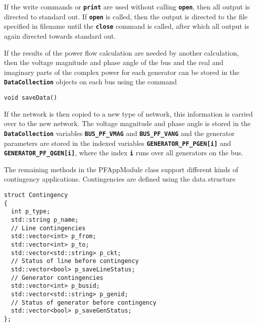 If the write commands or \texttt{\textbf{print}} are used without calling \texttt{\textbf{open}}, then all output is directed to standard out. If \texttt{\textbf{open}} is called, then the output is directed to the file specified in filename until the \texttt{\textbf{close}} command is called, after which all output is again directed towards standard out.

If the results of the power flow calculation are needed by another calculation, then the voltage magnitude and phase angle of the bus and the real and imaginary parts of the complex power for each generator can be stored in the \texttt{\textbf{DataCollection}} objects on each bus using the command

{
\color{red}
\begin{Verbatim}[fontseries=b]
void saveData()
\end{Verbatim}
}

If the network is then copied to a new type of network, this information is carried over to the new network. The voltage magnitude and phase angle is stored in the \texttt{\textbf{DataCollection}} variables \texttt{\textbf{BUS\_PF\_VMAG}} and \texttt{\textbf{BUS\_PF\_VANG}} and the generator parameters are stored in the indexed variables \texttt{\textbf{GENERATOR\_PF\_PGEN[i]}} and \texttt{\textbf{GENERATOR\_PF\_QGEN[i]}}, where the index \texttt{\textbf{i}} runs over all generators on the bus.

The remaining methods in the PFAppModule class support different kinds of contingency applications. Contingencies are defined using the data structure

{
\color{red}
\begin{Verbatim}[fontseries=b]
struct Contingency
{
  int p_type;
  std::string p_name;
  // Line contingencies
  std::vector<int> p_from;
  std::vector<int> p_to;
  std::vector<std::string> p_ckt;
  // Status of line before contingency
  std::vector<bool> p_saveLineStatus;
  // Generator contingencies
  std::vector<int> p_busid;
  std::vector<std::string> p_genid;
  // Status of generator before contingency
  std::vector<bool> p_saveGenStatus;
};
\end{Verbatim}
}

